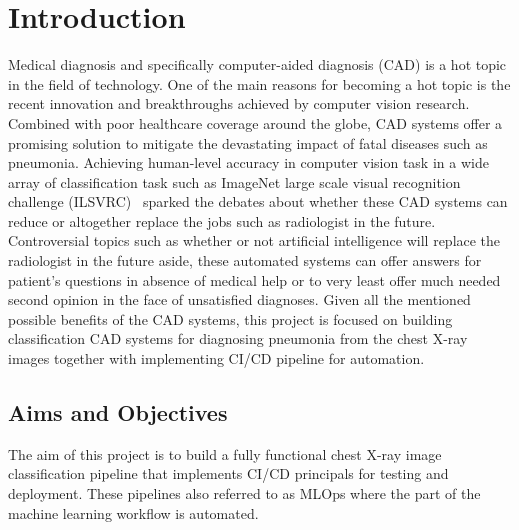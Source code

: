 \chapter{Introduction} \label{chap:introduction}

Medical diagnosis and specifically computer-aided diagnosis (CAD) is a hot topic in the field of technology. One of the main reasons for becoming a hot topic is the recent innovation and breakthroughs achieved by computer vision research. Combined with poor healthcare coverage around the globe, CAD systems offer a promising solution to mitigate the devastating impact of fatal diseases such as pneumonia. Achieving human-level accuracy in computer vision task in a wide array of classification task such as ImageNet large scale visual recognition challenge (ILSVRC)~\cite{imagenet} sparked the debates about whether these CAD systems can reduce or altogether replace the jobs such as radiologist in the future.
Controversial topics such as whether or not artificial intelligence will replace the radiologist in the future aside, these automated systems can offer answers for patient's questions in absence of medical help or to very least offer much needed second opinion in the face of unsatisfied diagnoses. Given all the mentioned possible benefits of the CAD systems, this project is focused on building classification CAD systems for diagnosing pneumonia from the chest X-ray images together with implementing CI/CD pipeline for automation.

\section{Aims and Objectives} \label{sec:aimsandobj}
The aim of this project is to build a fully functional chest X-ray image classification pipeline that implements CI/CD principals for testing and deployment.
These pipelines also referred to as MLOps where the part of the machine learning workflow is automated.

